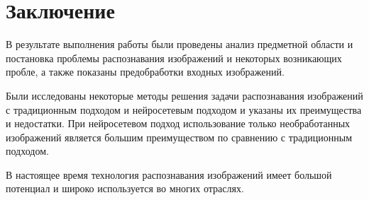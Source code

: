 \chapter*{Заключение}

В результате выполнения работы были проведены анализ предметной области и постановка проблемы распознавания изображений и некоторых возникающих пробле, а также показаны предобработки входных изображений.  

Были исследованы некоторые методы решения задачи распознавания изображений с традиционным подходом и нейросетевым подходом и указаны их преимущества и недостатки. При нейросетевом подход использование только необработанных изображений является большим преимуществом по сравнению с традиционным подходом.

 В настоящее время технология распознавания изображений имеет большой потенциал и широко используется во многих отраслях.